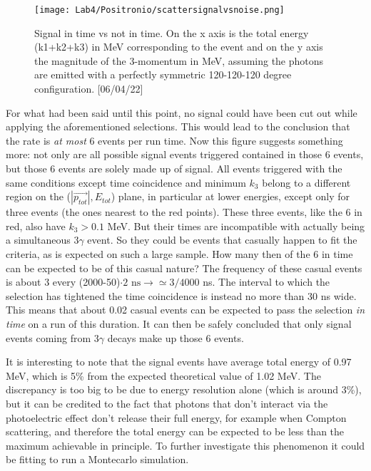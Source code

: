 \documentclass[10pt,a4paper,twocolumn]{article}
\begin{document}
\begin{figure}[h!]
\centering
\texttt{[image: Lab4/Positronio/scattersignalvsnoise.png]} 
\caption{Signal in time vs not in time. On the x axis is the total energy (k1+k2+k3) in MeV corresponding to the event and on the y axis the magnitude of the 3-momentum in MeV, assuming the photons are emitted with a perfectly symmetric 120-120-120 degree configuration. [06/04/22]}
\label{fig:scattersignalvsnoise}
\end{figure}

\noindent For what had been said until this point, no signal could have been cut out while applying the aforementioned selections. This would lead to the conclusion that the rate is \textit{at most} 6 events per run time. Now this figure suggests something more: not only are all possible signal events triggered contained in those 6 events, but those 6 events are solely made up of signal. All events triggered with the same conditions except time coincidence and minimum $k_3$ belong to a different region on the ($|\Vec{p_{tot}}|,E_{tot}$) plane, in particular at lower energies, except only for three events (the ones nearest to the red points). These three events, like the 6 in red, also have $k_3>0.1$ MeV. But their times are incompatible with actually being a simultaneous $3\gamma$ event. So they could be events that casually happen to fit the criteria, as is expected on such a large sample. How many then of the 6 in time can be expected to be of this casual nature? The frequency of these casual events is about 3 every (2000-50)$\cdot 2 \text{ ns} \rightarrow \simeq 3/4000$ ns. The interval to which the selection has tightened the time coincidence is instead no more than 30 ns wide. This means that about 0.02 casual events can be expected to pass the selection \textit{in time} on a run of this duration. It can then be safely concluded that only signal events coming from $3\gamma$ decays make up those 6 events.

It is interesting to note that the signal events have average total energy of 0.97 MeV, which is 5\% from the expected theoretical value of 1.02 MeV. The discrepancy is too big to be due to energy resolution alone (which is around 3\%), but it can be credited to the fact that photons that don't interact via the photoelectric effect don't release their full energy, for example when Compton scattering, and therefore the total energy can be expected to be less than the maximum achievable in principle. To further investigate this phenomenon it could be fitting to run a Montecarlo simulation. 
\end{document}
